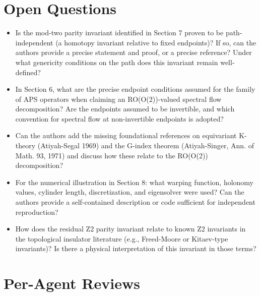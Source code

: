 \documentclass[11pt]{article}
\begin{document}
\section*{Open Questions}
\begin{itemize}[leftmargin=*]
  \item Is the mod-two parity invariant identified in Section 7 proven to be path-independent (a homotopy invariant relative to fixed endpoints)? If so, can the authors provide a precise statement and proof, or a precise reference? Under what genericity conditions on the path does this invariant remain well-defined?
  \item In Section 6, what are the precise endpoint conditions assumed for the family of APS operators when claiming an RO(O(2))-valued spectral flow decomposition? Are the endpoints assumed to be invertible, and which convention for spectral flow at non-invertible endpoints is adopted?
  \item Can the authors add the missing foundational references on equivariant K-theory (Atiyah-Segal 1969) and the G-index theorem (Atiyah-Singer, Ann. of Math. 93, 1971) and discuss how these relate to the RO(O(2)) decomposition?
  \item For the numerical illustration in Section 8: what warping function, holonomy values, cylinder length, discretization, and eigensolver were used? Can the authors provide a self-contained description or code sufficient for independent reproduction?
  \item How does the residual Z2 parity invariant relate to known Z2 invariants in the topological insulator literature (e.g., Freed-Moore or Kitaev-type invariants)? Is there a physical interpretation of this invariant in those terms?
\end{itemize}

\section*{Per-Agent Reviews}
\end{document}
